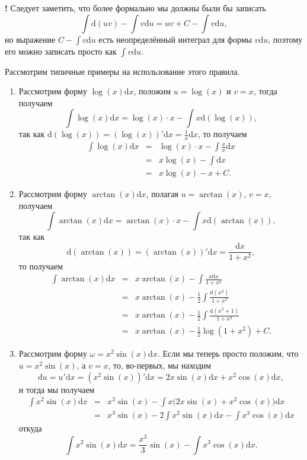\begin{mydanger}{\bf !}
    Следует заметить, что более формально мы должны были бы записать
    \[
    \int \mathrm{d}(uv) - \int v \mathrm{d}u = uv + C - \int v \mathrm{d}u,
    \]
    но выражение $C - \int v \mathrm{d}u$ есть неопределённый интеграл для формы $v\mathrm{d}u$, поэтому его можно записать просто как $\int v \mathrm{d}u.$
\end{mydanger}


\begin{example}
    Рассмотрим типичные примеры на использование этого правила.

    \begin{enumerate}
        \item Рассмотрим форму $\log(x) \mathrm{d}x$, положим $u = \log(x)$ и $v = x$, тогда получаем
\[ 
 \int \log(x) \mathrm{d}x =  \log(x)\cdot x - \int x \mathrm{d}(\log (x)),
 \]
так как $\mathrm{d}(\log(x)) = (\log(x))'\mathrm{d}x = \frac{1}{x}\mathrm{d}x$, то получаем
\begin{eqnarray*}
 \int \log(x) \mathrm{d}x &=& \log(x) \cdot x - \int \frac{x}{x}\mathrm{d}x \\
 &=& x \log(x) - \int \mathrm{d}x \\
 &=& x\log(x) - x + C.   
\end{eqnarray*}
\item Рассмотрим форму $\arctan(x) \mathrm{d}x$, полагая $u = \arctan(x)$, $v = x$, получаем
\[
 \int \arctan(x) \mathrm{d}x = \arctan(x) \cdot x  - \int x \mathrm{d}(\arctan(x)),
\]
так как 
\[
 \mathrm{d}(\arctan(x)) = (\arctan(x))'\mathrm{d}x = \frac{\mathrm{d}x}{1+ x^2},
\]
то получаем
\begin{eqnarray*}
    \int \arctan(x) \mathrm{d}x &=& x \arctan(x) - \int \frac{x\mathrm{d}x}{1+x^2} \\
    &=& x \arctan(x) - \frac{1}{2} \int \frac{\mathrm{d}(x^2)}{1+x^2} \\
    &=& x \arctan(x) - \frac{1}{2} \int \frac{\mathrm{d}(x^2+1)}{1+x^2}\\
    &=& x \arctan(x) - \frac{1}{2} \log(1+x^2) + C.
\end{eqnarray*}
 \item Рассмотрим форму $\omega = x^2 \sin(x) \mathrm{d}x$. Если мы теперь просто положим, что $u = x^2 \sin(x)$, а $v = x$, то, во-первых, мы находим
 \[
  \mathrm{d}u = u'\mathrm{d}x = (x^2 \sin(x))'\mathrm{d}x = 2x \sin(x) \mathrm{d}x + x^2 \cos(x) \mathrm{d}x,
 \]
и тогда мы получаем
\begin{eqnarray*}
  \int x^2 \sin(x) \mathrm{d}x &=& x^3 \sin(x) - \int x \bigl( 2x \sin(x) +x^2 \cos(x)  \bigr)\mathrm{d}x    \\
  &=& x^3 \sin(x) - 2 \int x^2 \sin(x) \mathrm{d}x - \int x^3 \cos(x)  \mathrm{d}x
\end{eqnarray*}
откуда
\[
 \int x^2 \sin(x) \mathrm{d}x = \frac{x^3}{3}\sin(x) -  \int x^3 \cos(x)  \mathrm{d}x.
\]


\end{enumerate}
\end{example}
